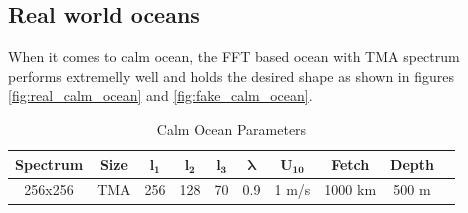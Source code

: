 \subsection{Real world oceans}
When it comes to calm ocean, the FFT based ocean with TMA spectrum performs extremelly well and holds the desired shape as shown in figures \ref{fig:real_calm_ocean} and \ref{fig:fake_calm_ocean}.
\begin{table}[h]
    \centering
    \begin{tabular}{|c|c|c|c|c|c|c|c|c|c|}
        \hline
        \textbf{Spectrum} & \textbf{Size} & $\mathbf{l_1}$ & $\mathbf{l_2}$ & $\mathbf{l_3}$ & $\mathbf{\lambda}$ & $\mathbf{U_{10}}$ & \textbf{Fetch} & \textbf{Depth} \\
        \hline
        256x256 & TMA & 256 & 128 & 70 & 0.9 & 1 m/s & 1000 km & 500 m \\
        \hline
    \end{tabular}
    \caption{Calm Ocean Parameters}
    \label{tab:calm_ocean}
\end{table}

